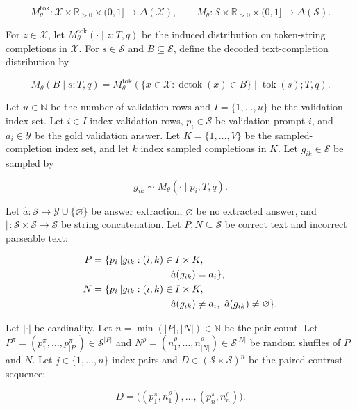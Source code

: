 \documentclass{article}
\begin{document}
\[
M_\theta^{\mathrm{tok}}:\mathcal X\times\mathbb R_{>0}\times(0,1]\to\Delta(\mathcal X),
\qquad
M_\theta:\mathcal S\times\mathbb R_{>0}\times(0,1]\to\Delta(\mathcal S).
\]

For \(z\in\mathcal X\), let \(M_\theta^{\mathrm{tok}}(\cdot\mid z;T,q)\) be the induced distribution on token-string completions in \(\mathcal X\).
For \(s\in\mathcal S\) and \(B\subseteq\mathcal S\), define the decoded text-completion distribution by

\[
M_\theta(B\mid s;T,q)
=M_\theta^{\mathrm{tok}}(\{x\in\mathcal X:\operatorname{detok}(x)\in B\}\mid \operatorname{tok}(s);T,q).
\]

Let \(u\in\mathbb N\) be the number of validation rows and \(I=\{1,\ldots,u\}\) be the validation index set.
Let \(i\in I\) index validation rows, \(p_i\in\mathcal S\) be validation prompt \(i\), and \(a_i\in\mathcal Y\) be the gold validation answer.
Let \(K=\{1,\ldots,V\}\) be the sampled-completion index set, and let \(k\) index sampled completions in \(K\).
Let \(g_{ik}\in\mathcal S\) be sampled by

\[
g_{ik} \sim M_\theta(\cdot \mid p_i; T, q).
\]

Let \(\hat a:\mathcal S\to\mathcal Y\cup\{\varnothing\}\) be answer extraction, \(\varnothing\) be no extracted answer, and \(\Vert:\mathcal S\times\mathcal S\to\mathcal S\) be string concatenation.
Let \(P,N\subseteq\mathcal S\) be correct text and incorrect parseable text:

\[
\begin{aligned}
P={}&\{p_i \Vert g_{ik}:(i,k)\in I\times K,\\
&\hspace{2.4cm}\hat a(g_{ik})=a_i\},\\
N={}&\{p_i \Vert g_{ik}:(i,k)\in I\times K,\\
&\hspace{2.4cm}\hat a(g_{ik})\ne a_i,\ \hat a(g_{ik})\ne\varnothing\}.
\end{aligned}
\]

Let \(|\cdot|\) be cardinality.
Let \(n=\min(|P|,|N|)\in\mathbb N\) be the pair count.
Let \(P^\pi=(p^\pi_1,\ldots,p^\pi_{|P|})\in\mathcal S^{|P|}\) and \(N^\rho=(n^\rho_1,\ldots,n^\rho_{|N|})\in\mathcal S^{|N|}\) be random shuffles of \(P\) and \(N\).
Let \(j\in\{1,\ldots,n\}\) index pairs and \(D\in(\mathcal S\times\mathcal S)^n\) be the paired contrast sequence:

\[
D=\bigl((p^\pi_1,n^\rho_1),\ldots,(p^\pi_n,n^\rho_n)\bigr).
\]
\end{document}
